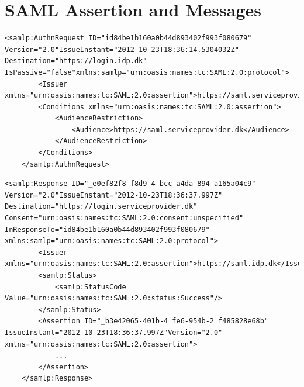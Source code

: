 \documentclass[twosided]{report}
\begin{document}
\appendix
\chapter{SAML Assertion and Messages}
\begin{lstlisting}[style=cxml, caption={[Sample SAML AuthnRequest message]Sample SAML AuthnRequest message \cite{jacob}.}]
	<samlp:AuthnRequest ID="id84be1b160a0b44d893402f993f080679" Version="2.0"IssueInstant="2012-10-23T18:36:14.5304032Z" Destination="https://login.idp.dk" IsPassive="false"xmlns:samlp="urn:oasis:names:tc:SAML:2.0:protocol">
		<Issuer xmlns="urn:oasis:names:tc:SAML:2.0:assertion">https://saml.serviceprovider.dk</Issuer>
		<Conditions xmlns="urn:oasis:names:tc:SAML:2.0:assertion">
			<AudienceRestriction>
				<Audience>https://saml.serviceprovider.dk</Audience>
			</AudienceRestriction>
		</Conditions>
	</samlp:AuthnRequest>
\end{lstlisting}

\begin{lstlisting}[style=cxml, caption={[Sample SAML Response message without the content of the Assertion]Sample SAML Response message without the content of the Assertion \cite{jacob}.}]
	<samlp:Response ID="_e0ef82f8-f8d9-4 bcc-a4da-894 a165a04c9" Version="2.0"IssueInstant="2012-10-23T18:36:37.997Z" Destination="https://login.serviceprovider.dk" Consent="urn:oasis:names:tc:SAML:2.0:consent:unspecified" InResponseTo="id84be1b160a0b44d893402f993f080679" xmlns:samlp="urn:oasis:names:tc:SAML:2.0:protocol">
		<Issuer xmlns="urn:oasis:names:tc:SAML:2.0:assertion">https://saml.idp.dk</Issuer>
		<samlp:Status>
			<samlp:StatusCode Value="urn:oasis:names:tc:SAML:2.0:status:Success"/>
		</samlp:Status>
		<Assertion ID="_b3e42065-401b-4 fe6-954b-2 f485828e68b" IssueInstant="2012-10-23T18:36:37.997Z"Version="2.0" xmlns="urn:oasis:names:tc:SAML:2.0:assertion">
			...
		</Assertion>
	</samlp:Response>
\end{lstlisting}
\end{document}
